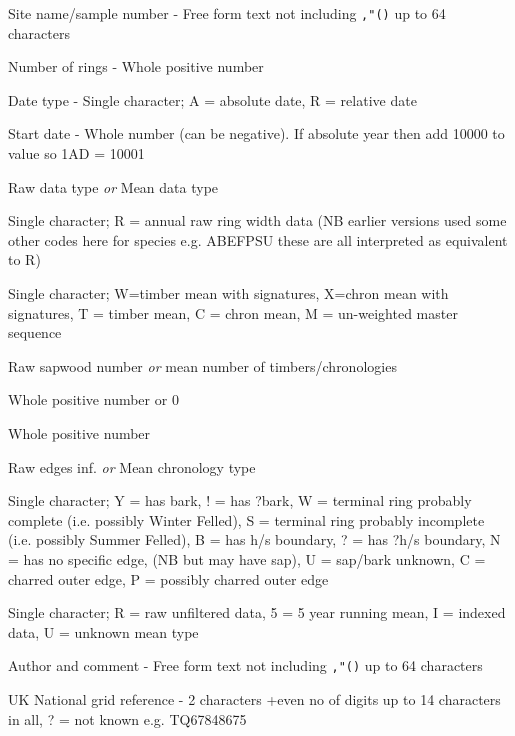 \begin{enumerate*}
 \item Site name/sample number - Free form text not including \verb|,"()| up to 64 characters 
 \item Number of rings - Whole positive number 
 \item Date type - Single character; A = absolute date, R = relative date 
 \item Start date - Whole number (can be negative).  If absolute year then add 10000 to value so 1AD = 10001
 \item Raw data type \emph{or} Mean data type 
      \begin{itemize*}   
       \item Single character; R = annual raw ring width data (NB earlier versions used some other codes here for species e.g. ABEFPSU these are all interpreted as equivalent to R) 
       \item Single character; W=timber mean with signatures, X=chron mean with signatures, T = timber mean, C = chron mean, M = un-weighted master sequence 
      \end{itemize*} 
 \item Raw sapwood number \emph{or} mean number of timbers/chronologies
      \begin{itemize*}   
       \item Whole positive number or 0 
       \item Whole positive number
      \end{itemize*} 
 \item Raw edges inf. \emph{or} Mean chronology type
      \begin{itemize*}   
       \item Single character; Y = has bark, ! = has ?bark, W = terminal ring probably complete (i.e. possibly Winter Felled), S = terminal ring probably incomplete (i.e. possibly Summer Felled), B = has h/s boundary, ? = has ?h/s boundary, N = has no specific edge, (NB but may have sap), U = sap/bark unknown, C = charred outer edge, P = possibly charred outer edge 
       \item Single character; R = raw unfiltered data, 5 = 5 year running mean, I = indexed data, U = unknown mean type 
      \end{itemize*} 
 \item Author and comment - Free form text not including \verb|,"()| up to 64 characters 
 \item UK National grid reference - 2 characters +even no of digits up to 14 characters in all, ? = not known e.g. TQ67848675

\end{enumerate*}
